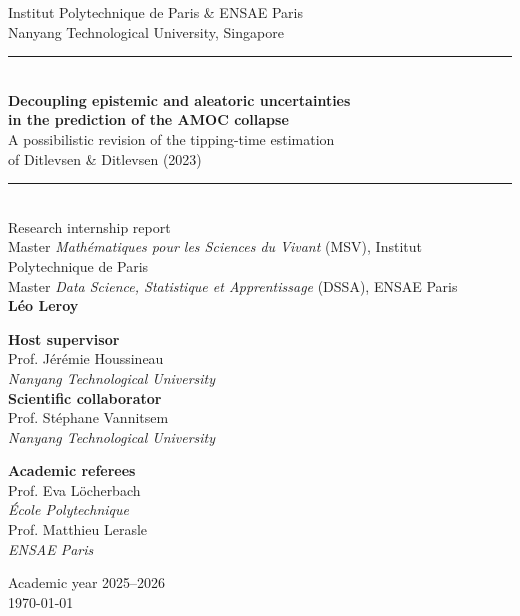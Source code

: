 \documentclass[12pt,a4paper]{article}
\theoremstyle{definition}
\theoremstyle{plain}
\begin{document}


    

\begin{titlepage}
\centering
\vspace*{0.5cm}

{\large Institut Polytechnique de Paris \& ENSAE Paris}\\[0.3cm]
{\large Nanyang Technological University, Singapore}\\[1.6cm]

\rule{\textwidth}{0.6pt}\\[0.6cm]
{\LARGE\bfseries Decoupling epistemic and aleatoric uncertainties\\[0.35cm]
in the prediction of the AMOC collapse}\\[0.6cm]
{\large A possibilistic revision of the tipping-time estimation\\ of Ditlevsen \& Ditlevsen (2023)}\\[0.5cm]
\rule{\textwidth}{0.6pt}\\[1.4cm]

{\large Research internship report}\\[0.3cm]
{\normalsize Master \emph{Mathématiques pour les Sciences du Vivant} (MSV), Institut Polytechnique de Paris\\
Master \emph{Data Science, Statistique et Apprentissage} (DSSA), ENSAE Paris}\\[1.6cm]

{\Large\bfseries Léo Leroy}\\[1.8cm]

\begin{minipage}{0.46\textwidth}
\raggedright
\textbf{Host supervisor}\\
Prof. Jérémie Houssineau\\
\emph{Nanyang Technological University}\\[0.5cm]
\textbf{Scientific collaborator}\\
Prof. Stéphane Vannitsem\\
\emph{Nanyang Technological University }
\end{minipage}
\hfill
\begin{minipage}{0.46\textwidth}
\raggedleft
\textbf{Academic referees}\\
Prof. Eva Löcherbach\\
\emph{École Polytechnique}\\[0.5cm]
Prof. Matthieu Lerasle\\
\emph{ENSAE Paris}
\end{minipage}

\vfill
{\large Academic year 2025--2026}\\[0.3cm]
{\normalsize \today}
\end{titlepage}
\end{document}
